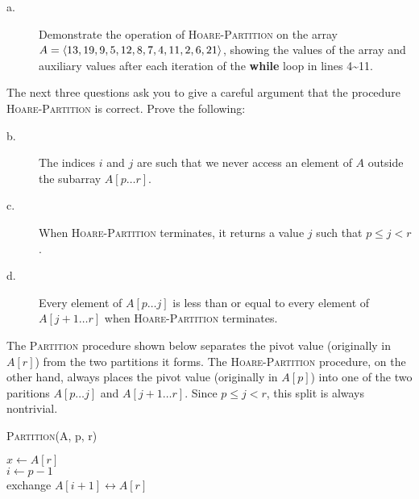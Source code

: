\documentclass[a4paper,10pt]{article}
\begin{document}
\begin{description}
\item[a. \hspace{9pt}] Demonstrate the operation of \textsc{Hoare-Partition} on the array 
$A=\langle13, 19, 9, 5, 12, 8, 7, 4, 11,\\ 2, 6, 21\rangle$, showing the values of
the array and auxiliary values after each iteration of the \textbf{while} loop in lines 4\textasciitilde 11.\\

\end{description}
The next three questions ask you to give a careful argument that the procedure \textsc{Hoare-Partition} is correct.
Prove the following:

\begin{description}
\item[b. \hspace{9pt}] The indices $i$ and $j$ are such that we never access an element of $A$ outside
the subarray $A[p\ldots r]$.

\item[c. \hspace{9pt}] When \textsc{Hoare-Partition} terminates, it returns a value $j$ such that $p\leq j < r$.

\item[d. \hspace{9pt}] Every element of $A[p\ldots j]$ is less than or equal to every element of
$A[j + 1\ldots r]$ when \textsc{Hoare-Partition} terminates.
\end{description}

The \textsc{Partition} procedure shown below separates the pivot value (originally in $A[r]$) from the
two partitions it forms. The \textsc{Hoare-Partition} procedure,
on the other hand, always places the pivot value (originally in $A[p]$) into one of the two paritions
$A[p\ldots j]$ and $A[j + 1\ldots r]$. Since $p\leq j < r$, this
split is always nontrivial.

\begin{algorithm}[H]
\caption{\textsc{Partition}(A, p, r)}
$x\leftarrow A[r]$\\
$i \leftarrow p - 1$\\
exchange $A[i + 1]\leftrightarrow A[r]$\\
\end{algorithm}
\end{document}
